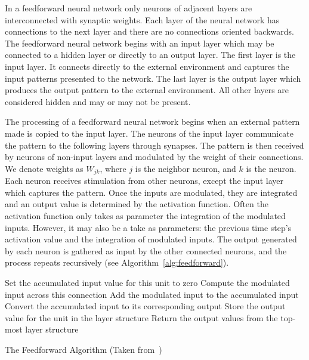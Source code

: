 \documentclass[11pt]{article}
\begin{document}
In a feedforward neural network only neurons of adjacent layers are interconnected with synaptic weights. Each layer of the neural
network has connections to the next layer and there are no connections oriented backwards. The feedforward neural network begins with an
input layer which may be connected to a hidden layer or directly to an output layer. The first layer is the input layer. It connects
directly to the external environment and captures the input patterns presented to the network. The last layer is the output layer which
produces the output pattern to the external environment. All other layers are considered hidden and may or may not be present.

The processing of a feedforward neural network begins when an external pattern made is copied to the input layer. The neurons of the
input layer communicate the pattern to the following layers through synapses. The pattern is then received by neurons of non-input
layers and modulated by the weight of their connections. We denote weights as $W_{jk}$, where $j$ is the neighbor neuron, and $k$ is the
neuron. Each neuron receives stimulation from other neurons, except the input layer which captures the pattern. Once the inputs are
modulated, they are integrated and an output value is determined by the activation function. Often the activation function only takes as
parameter the integration of the modulated inputs. However, it may also be a take as parameters: the previous time step's activation
value and the integration of modulated inputs. The output generated by each neuron is gathered as input by the other connected neurons,
and the process repeats recursively (see Algorithm~\ref{alg:feedforward}).

\begin{algorithm}%
\dontprintsemicolon
{}
\SetLine
{}
{
	{
		Set the accumulated input value for this unit to zero\;
			{
				Compute the modulated input across this connection\;
				Add the modulated input to the accumulated input\;
			}
		Convert the accumulated input to its corresponding output\;
		Store the output value for the unit in the layer structure\;
	}
	Return the output values from the top-most layer structure\;
}

\caption{The Feedforward Algorithm (Taken from~\cite{skapura})}
\label{alg:feedforward}
\end{algorithm}
\end{document}
